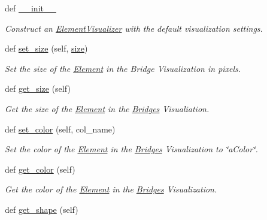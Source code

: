 \begin{DoxyCompactItemize}
\item 
def \hyperlink{class_element_visualizer_1_1_element_visualizer_a03d40d1a8fa79b6c419cda1f74f4ff78}{\+\_\+\+\_\+init\+\_\+\+\_\+}
\begin{DoxyCompactList}\small\item\em Construct an \hyperlink{class_element_visualizer_1_1_element_visualizer}{Element\+Visualizer} with the default visualization settings. \end{DoxyCompactList}\item 
def \hyperlink{class_element_visualizer_1_1_element_visualizer_aee672be3030871ab10322d72c1ff373b}{set\+\_\+size} (self, \hyperlink{class_element_visualizer_1_1_element_visualizer_ab4c0c8c7f0d19673eb6a75ddc06e14f9}{size})
\begin{DoxyCompactList}\small\item\em Set the size of the \hyperlink{namespace_element}{Element} in the Bridge Visualization in pixels. \end{DoxyCompactList}\item 
def \hyperlink{class_element_visualizer_1_1_element_visualizer_afa3a236ae79cb287f62e763bf978d55f}{get\+\_\+size} (self)
\begin{DoxyCompactList}\small\item\em Get the size of the \hyperlink{namespace_element}{Element} in the \hyperlink{namespace_bridges}{Bridges} Visualiation. \end{DoxyCompactList}\item 
def \hyperlink{class_element_visualizer_1_1_element_visualizer_ad922ece69d490e198a8f5e9178161b3d}{set\+\_\+color} (self, col\+\_\+name)
\begin{DoxyCompactList}\small\item\em Set the color of the \hyperlink{namespace_element}{Element} in the \hyperlink{namespace_bridges}{Bridges} Visualization to \char`\"{}a\+Color\char`\"{}. \end{DoxyCompactList}\item 
def \hyperlink{class_element_visualizer_1_1_element_visualizer_a3b1aa82fa7dc8fa58100928c6362271d}{get\+\_\+color} (self)
\begin{DoxyCompactList}\small\item\em Get the color of the \hyperlink{namespace_element}{Element} in the \hyperlink{namespace_bridges}{Bridges} Visualization. \end{DoxyCompactList}\item 
def \hyperlink{class_element_visualizer_1_1_element_visualizer_a8e1e07ce1c86d96afa4a6b1f1c6927f6}{get\+\_\+shape} (self)

\end{DoxyCompactItemize}
